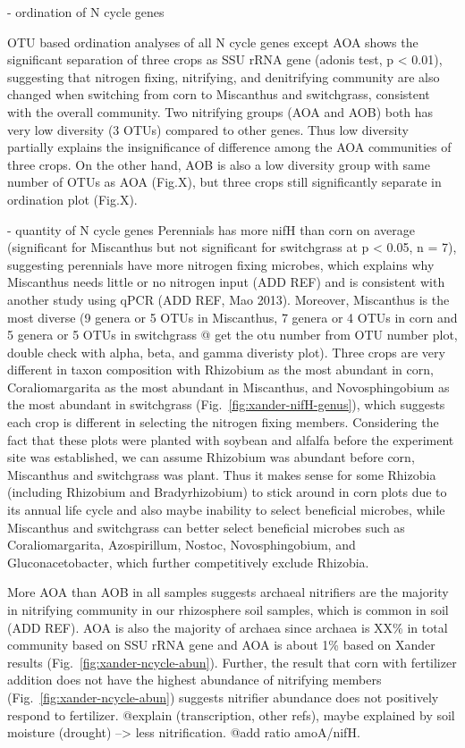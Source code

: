 \documentclass[12pt]{article}
\begin{document}
- ordination of N cycle genes

OTU based ordination analyses of all N cycle genes except AOA shows the significant separation of three crops as SSU rRNA gene (adonis test, p < 0.01), suggesting that nitrogen fixing, nitrifying, and denitrifying community are also changed when switching from corn to Miscanthus and switchgrass, consistent with the overall community. Two nitrifying groups (AOA and AOB) both has very low diversity (3 OTUs) compared to other genes. Thus low diversity partially explains the insignificance of difference among the AOA communities of three crops. On the other hand, AOB is also a low diversity group with same number of OTUs as AOA (Fig.X), but three crops still significantly separate in ordination plot (Fig.X).

- quantity of N cycle genes
Perennials has more nifH than corn on average (significant for Miscanthus but not significant for switchgrass at p < 0.05, n = 7), suggesting perennials have more nitrogen fixing microbes, which explains why Miscanthus needs little or no nitrogen input (ADD REF) and is consistent with another study using qPCR (ADD REF, Mao 2013). Moreover, Miscanthus is the most diverse (9 genera or 5 OTUs in Miscanthus, 7 genera or 4 OTUs in corn and 5 genera or 5 OTUs in switchgrass @ get the otu number from OTU number plot, double check with alpha, beta, and gamma diveristy plot). Three crops are very different in taxon composition with Rhizobium as the most abundant in corn, Coraliomargarita as the most abundant in Miscanthus, and Novosphingobium as the most abundant in switchgrass (Fig.~\ref{fig:xander-nifH-genus}), which suggests each crop is different in selecting the nitrogen fixing members. Considering the fact that these plots were planted with soybean and alfalfa before the experiment site was established, we can assume Rhizobium was abundant before corn, Miscanthus and switchgrass was plant. Thus it makes sense for some Rhizobia (including Rhizobium and Bradyrhizobium) to stick around in corn plots due to its annual life cycle and also maybe inability to select beneficial microbes, while Miscanthus and switchgrass can better select beneficial microbes such as Coraliomargarita, Azospirillum, Nostoc, Novosphingobium, and Gluconacetobacter, which further competitively exclude Rhizobia.

More AOA than AOB in all samples suggests archaeal nitrifiers are the majority in nitrifying community in our rhizosphere soil samples, which is common in soil (ADD REF). AOA is also the majority of archaea since archaea is XX\% in total community based on SSU rRNA gene and AOA is about 1\% based on Xander results (Fig.~\ref{fig:xander-ncycle-abun}). Further, the result that corn with fertilizer addition does not have the highest abundance of nitrifying members (Fig.~\ref{fig:xander-ncycle-abun}) suggests nitrifier abundance does not positively respond to fertilizer. @explain (transcription, other refs), maybe explained by soil moisture (drought) --> less nitrification. @add ratio amoA/nifH.
\end{document}
